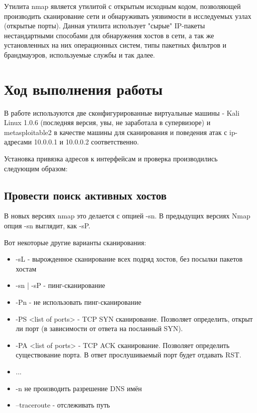 \documentclass[a4paper]{article}
\begin{document}
Утилита nmap является утилитой с открытым исходным кодом, позволяющей производить сканирование сети и обнаруживать уязвимости в исследуемых узлах (открытые порты). Данная утилита использует "сырые" IP-пакеты нестандартными способами для обнаружения хостов в сети, а так же установленных на них операционных систем, типы пакетных фильтров и брандмауэров, используемые службы и так далее.

\section{Ход выполнения работы}

В работе используются две сконфигурированные виртуальные машины - Kali Linux 1.0.6 (последняя версия, увы, не заработала в супервизоре) и metasploitable2 в качестве машины для сканирования и поведения атак с ip-адресами 10.0.0.1 и 10.0.0.2 соответственно.

Установка привязка адресов к интерфейсам и проверка производились следующим образом:



\subsection{Провести поиск активных хостов}

В новых версиях nmap это делается с опцией -sn. В предыдущих версиях Nmap опция -sn выглядит, как -sP. 

Вот некоторые другие варианты сканирования:

\begin{itemize}
\item -sL - вырожденное сканирование всех подряд хостов, без посылки пакетов хостам
\item -sn | -sP - пинг-сканирование
\item -Pn - не использовать пинг-сканирование
\item -PS <list of ports> - TCP SYN сканирование. Позволяет определить, открыт ли порт (в зависимости от ответа на посланный SYN).
\item -PA <list of ports> - TCP ACK сканирование. Позволяет определить существование порта. В ответ прослушиваемый порт будет отдавать RST.
\item ...
\item -n не производить разрешение DNS имён
\item --traceroute - отслеживать путь
\end{itemize}
\end{document}
